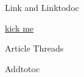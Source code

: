 \documentclass[a4paper]{article}
\begin{document}
\Huge

\tableofcontents

Link and Linktodoc

\hyperlink{dummy.pdf.1}{kick me}


Article Threads




Addtotoc

\end{document}
